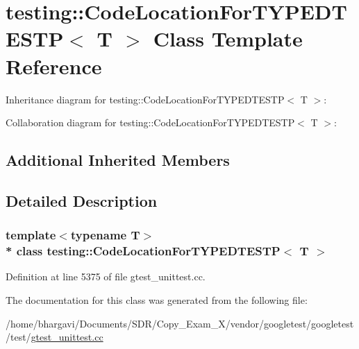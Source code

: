 \hypertarget{classtesting_1_1_code_location_for_t_y_p_e_d_t_e_s_t_p}{}\section{testing\+:\+:Code\+Location\+For\+T\+Y\+P\+E\+D\+T\+E\+S\+TP$<$ T $>$ Class Template Reference}
\label{classtesting_1_1_code_location_for_t_y_p_e_d_t_e_s_t_p}


Inheritance diagram for testing\+:\+:Code\+Location\+For\+T\+Y\+P\+E\+D\+T\+E\+S\+TP$<$ T $>$\+:


Collaboration diagram for testing\+:\+:Code\+Location\+For\+T\+Y\+P\+E\+D\+T\+E\+S\+TP$<$ T $>$\+:
\subsection*{Additional Inherited Members}


\subsection{Detailed Description}
\subsubsection*{template$<$typename T$>$\\*
class testing\+::\+Code\+Location\+For\+T\+Y\+P\+E\+D\+T\+E\+S\+T\+P$<$ T $>$}



Definition at line 5375 of file gtest\+\_\+unittest.\+cc.



The documentation for this class was generated from the following file\+:\begin{DoxyCompactItemize}
\item 
/home/bhargavi/\+Documents/\+S\+D\+R/\+Copy\+\_\+\+Exam\+\_\+X/vendor/googletest/googletest/test/\hyperlink{gtest__unittest_8cc}{gtest\+\_\+unittest.\+cc}\end{DoxyCompactItemize}
